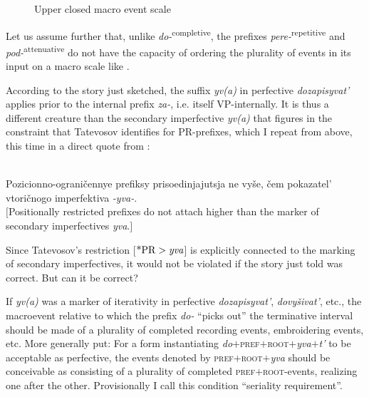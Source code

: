 \documentclass[output=paper,
colorlinks,
citecolor=brown,
newtxmath
]{langscibook}
\begin{document}
\begin{figure}
\caption{Upper closed macro event scale}
\label{fig:macroscale}
\end{figure}

Let us assume further that, unlike \textit{do-}\textsuperscript{completive}, the prefixes \textit{pere-}\textsuperscript{repetitive} and \textit{pod-}\textsuperscript{attenuative} do not have the capacity of ordering the plurality of events in its input on a macro scale like .

According to the story just sketched, the suffix \textit{yv(a)} in perfective \textit{dozapisyvat'} applies prior to the internal prefix \textit{za-}, i.e. itself VP-internally. It is thus a different creature than the secondary imperfective \textit{yv(a)} that figures in the constraint that Tatevosov identifies for PR-prefixes, which I repeat from above, this time in a direct quote from \citet[4]{Tatevosov2013b}:


\\Pozicionno-ograničennye prefiksy prisoedinjajutsja ne vyše, čem pokazatel' vtoričnogo imperfektiva \textit{-yva-}.\smallskip\\
$[$Positionally restricted prefixes do not attach higher than the marker of secondary imperfectives \textit{yva}.$]$
\z

\noindent Since Tatevosov's restriction [$\text{*PR}>\text{\textit{yva}}$] is explicitly connected to the marking of secondary imperfectives, it would not be violated if the story just told was correct. But can it be correct?

If \textit{yv(a)} was a marker of iterativity in perfective \textit{dozapisyvat'}, \textit{dovyšivat'}, etc., the macroevent relative to which the prefix \textit{do-} ``picks out'' the terminative interval should be made of a plurality of completed recording events, embroidering events, etc. More generally put: For a form instantiating \textit{do}$+$\textsc{pref}$+$\textsc{root}$+$\textit{yva}$+$\textit{t'} to be acceptable as perfective, the events denoted by \textsc{pref}$+$\textsc{root}$+$\textit{yva} should be conceivable as consisting of a plurality of completed  \textsc{pref}$+$\textsc{root}-events, realizing one after the other. Provisionally I call this condition ``seriality requirement''.
\end{document}
